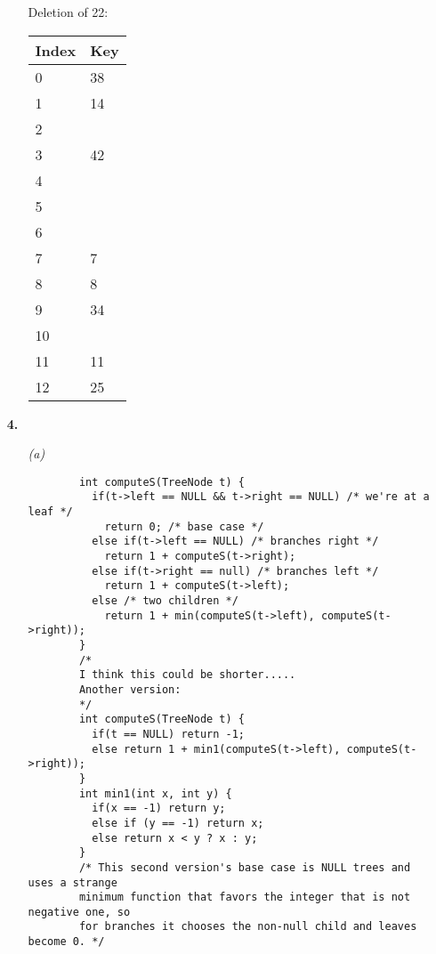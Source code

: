 \documentclass{article}
\begin{document}
\begin{enumerate}
\begin{enumerate}
      Deletion of 22:

      \begin{tabular}[t]{l | l}
      \textbf{Index} & \textbf{Key} \\ \hline
      0 & 38 \\
      1 & 14 \\
      2 &  \\
      3 & 42 \\
      4 &  \\
      5 &  \\
      6 &  \\
      7 & 7 \\
      8 & 8 \\
      9 & 34  \\
      10 &   \\
      11 & 11 \\
      12 & 25 \\
      \end{tabular}

  \end{enumerate}

\item[\textbf{4.}]

  \begin{enumerate}
    \item[\emph{(a)}]
      \begin{verbatim}
        int computeS(TreeNode t) {
          if(t->left == NULL && t->right == NULL) /* we're at a leaf */
            return 0; /* base case */
          else if(t->left == NULL) /* branches right */
            return 1 + computeS(t->right);
          else if(t->right == null) /* branches left */
            return 1 + computeS(t->left);
          else /* two children */
            return 1 + min(computeS(t->left), computeS(t->right));
        }
        /*
        I think this could be shorter.....
        Another version:
        */
        int computeS(TreeNode t) {
          if(t == NULL) return -1;
          else return 1 + min1(computeS(t->left), computeS(t->right));
        }
        int min1(int x, int y) { 
          if(x == -1) return y;
          else if (y == -1) return x;
          else return x < y ? x : y;
        }
        /* This second version's base case is NULL trees and uses a strange
        minimum function that favors the integer that is not negative one, so
        for branches it chooses the non-null child and leaves become 0. */
      \end{verbatim}


\end{enumerate}
\end{enumerate}
\end{document}
